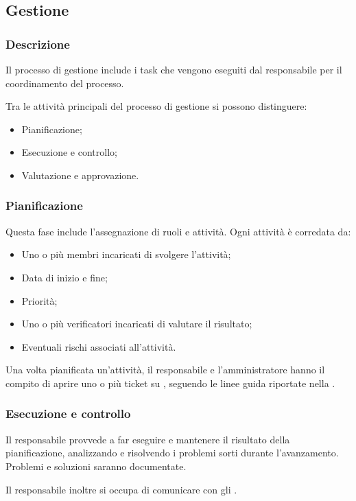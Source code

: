 \subsection{Gestione}

\subsubsection{Descrizione}
\par Il processo di gestione include i task che vengono eseguiti dal responsabile per il coordinamento del processo.
\par Tra le attività principali del processo di gestione si possono distinguere:
\begin{itemize}
  \item Pianificazione;
  \item Esecuzione e controllo;
  \item Valutazione e approvazione.
\end{itemize}

\subsubsection{Pianificazione}
\par Questa fase include l'assegnazione di ruoli e attività. Ogni attività è corredata da:
\begin{itemize}
  \item Uno o più membri incaricati di svolgere l'attività;
  \item Data di inizio e fine;
  \item Priorità;
  \item Uno o più verificatori incaricati di valutare il risultato;
  \item Eventuali rischi associati all'attività.
\end{itemize}

\vspace{0.5\baselineskip}
\par Una volta pianificata un'attività, il responsabile e l'amministratore hanno il compito di aprire uno o più ticket su , seguendo le linee guida riportate nella .

\subsubsection{Esecuzione e controllo}
\par Il responsabile provvede a far eseguire e mantenere il risultato della pianificazione, analizzando e risolvendo i problemi sorti durante l'avanzamento. Problemi e soluzioni saranno documentate.
\par Il responsabile inoltre si occupa di comunicare con gli .


